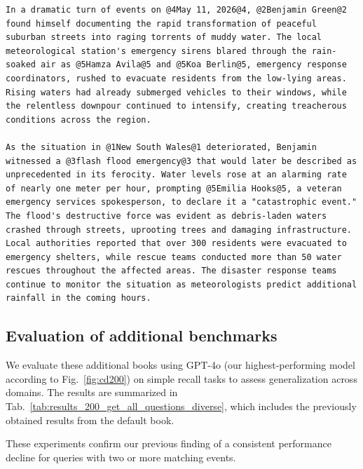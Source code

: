 \documentclass{article}
\begin{document}
\begin{lstlisting}[style=mystyle, caption={Excerpt chapter from the news book. Event information and secondary entities have been highlighted. The generated content is fictional.}, label={lst:single_chapter_example_worldnews}]
In a dramatic turn of events on @4May 11, 2026@4, @2Benjamin Green@2 found himself documenting the rapid transformation of peaceful suburban streets into raging torrents of muddy water. The local meteorological station's emergency sirens blared through the rain-soaked air as @5Hamza Avila@5 and @5Koa Berlin@5, emergency response coordinators, rushed to evacuate residents from the low-lying areas. Rising waters had already submerged vehicles to their windows, while the relentless downpour continued to intensify, creating treacherous conditions across the region.

As the situation in @1New South Wales@1 deteriorated, Benjamin witnessed a @3flash flood emergency@3 that would later be described as unprecedented in its ferocity. Water levels rose at an alarming rate of nearly one meter per hour, prompting @5Emilia Hooks@5, a veteran emergency services spokesperson, to declare it a "catastrophic event." The flood's destructive force was evident as debris-laden waters crashed through streets, uprooting trees and damaging infrastructure. Local authorities reported that over 300 residents were evacuated to emergency shelters, while rescue teams conducted more than 50 water rescues throughout the affected areas. The disaster response teams continue to monitor the situation as meteorologists predict additional rainfall in the coming hours.
\end{lstlisting}

\subsection{Evaluation of additional benchmarks}

We evaluate these additional books using GPT-4o (our highest-performing model according to Fig.~\ref{fig:cd200}) on simple recall tasks to assess generalization across domains. 
The results are summarized in Tab.~\ref{tab:results_200_get_all_questions_diverse}, which includes the previously obtained results from the default book.

These experiments confirm our previous finding of a consistent performance decline for queries with two or more matching events.
\end{document}
